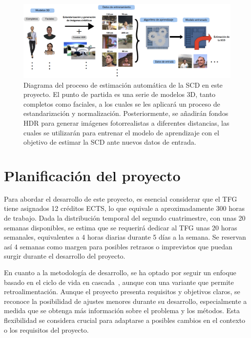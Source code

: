 \begin{figure}[h]
	\centering
	\includegraphics[width=\textwidth]{imagenes/cap1/resumen.png}
	\caption[Diagrama del proyecto.]{Diagrama del proceso de estimación automática de la SCD en este proyecto. El punto de partida es una serie de modelos 3D, tanto completos como faciales, a los cuales se les aplicará un proceso de estandarización y normalización. Posteriormente, se añadirán fondos HDR para generar imágenes fotorrealistas a diferentes distancias, las cuales se utilizarán para entrenar el modelo de aprendizaje con el objetivo de estimar la SCD ante nuevos datos de entrada.}
	\label{fig3}
\end{figure}

\section{Planificación del proyecto}

Para abordar el desarrollo de este proyecto, es esencial considerar que el TFG tiene asignados 12 créditos ECTS, lo que equivale a aproximadamente 300 horas de trabajo. Dada la distribución temporal del segundo cuatrimestre, con unas 20 semanas disponibles, se estima que se requerirá dedicar al TFG unas 20 horas semanales, equivalentes a 4 horas diarias durante 5 días a la semana. Se reservan así 4 semanas como margen para posibles retrasos o imprevistos que puedan surgir durante el desarrollo del proyecto.

En cuanto a la metodología de desarrollo, se ha optado por seguir un enfoque basado en el ciclo de vida en cascada~\cite{38}, aunque con una variante que permite retroalimentación. Aunque el proyecto presenta requisitos y objetivos claros, se reconoce la posibilidad de ajustes menores durante su desarrollo, especialmente a medida que se obtenga más información sobre el problema y los métodos. Esta flexibilidad se considera crucial para adaptarse a posibles cambios en el contexto o los requisitos del proyecto.

